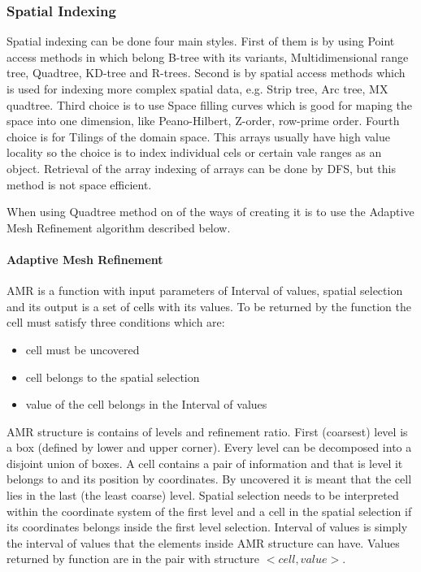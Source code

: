\subsubsection{Spatial Indexing}
Spatial indexing can be done four main styles. First of them is by using Point access methods in which belong B-tree with its variants, Multidimensional range tree, Quadtree, KD-tree and R-trees. \cite{Rtree} Second is by spatial access methods which is used for indexing more complex spatial data, e.g. Strip tree, Arc tree, MX quadtree. Third choice is to use Space filling curves which is good for maping the space into one dimension, like Peano-Hilbert, Z-order, row-prime order. Fourth choice is for Tilings of the domain space.\cite{joinFractal} This arrays usually have high value locality so the choice is to index individual cels or certain vale ranges as an object. Retrieval of the array indexing of arrays can be done by DFS, but this method is not space efficient. \cite{MDindexingBTree}

When using Quadtree method on of the ways of creating it is to use the Adaptive Mesh Refinement algorithm described below.

\paragraph{Adaptive Mesh Refinement}
AMR is a function with input parameters of Interval of values, spatial selection and its output is a set of cells with its values. To be returned by the function the cell must satisfy three conditions which are:
\begin{itemize}
\item cell must be uncovered
\item cell belongs to the spatial selection
\item value of the cell belongs in the Interval of values
\end{itemize}
AMR structure is contains of levels and refinement ratio. \cite{AMRindexing} First (coarsest) level is a box (defined by lower and upper corner). Every level can be decomposed into a disjoint union of boxes. A cell contains a pair of information and that is level it belongs to and its position by coordinates. By uncovered it is meant that the cell lies in the last (the least coarse) level. Spatial selection needs to be interpreted within the coordinate system of the first level and a cell in the spatial selection if its coordinates belongs inside the first level selection. Interval of values is simply the interval of values that the elements inside AMR structure can have. Values returned by function are in the pair with structure $<cell, value>$.

